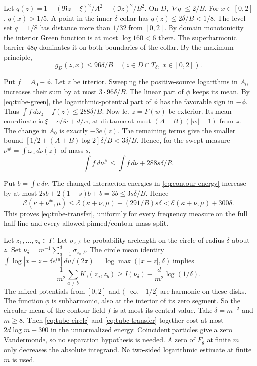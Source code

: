 Let \(q(z)=1-(\Re z-\xi)^2/A^2-(\Im z)^2/B^2\). On \(D\),
\(|\nabla q|\le2/B\). For \(x\in[0,2]\), \(q(x)>1/5\). A point in the inner
\(\delta\)-collar has \(q(z)\le2\delta/B<1/8\). The level set \(q=1/8\) has
distance more than \(1/32\) from \([0,2]\). By domain monotonicity the
interior Green function is at most \(\log160<6\) there. The superharmonic
barrier \(48q\) dominates it on both boundaries of the collar. By the
maximum principle,
\begin{equation}\label{eq:tube-gD}
 g_D(z,x)\le96\delta/B
       \quad(z\in D\cap T_\delta,\ x\in[0,2]).
\end{equation}

Put \(f=A_0-\phi\). Let \(z\) be interior. Sweeping the positive-source
logarithms in \(A_0\) increases their sum by at most \(3\cdot96\delta/B\).
The linear part of \(\phi\) keeps its mean. By \eqref{eq:tube-green}, the
logarithmic-potential part of \(\phi\) has the favorable sign in \(-\phi\).
Thus \(\int f\,d\omega_z-f(z)\le288\delta/B\). Now let \(z=F(w)\) be
exterior. Its mean coordinate is \(\xi+c/\overline w+d/w\), at distance at
most \((A+B)(|w|-1)\) from \(z\). The change in \(A_0\) is exactly
\(-3e(z)\). The remaining terms give the smaller bound
\([1/2+(A+B)\log2]\delta/B<3\delta/B\). Hence, for the swept measure
\(\nu^\#=\int\omega_z\,d\nu(z)\) of mass \(s\),
\[
 \int f\,d\nu^\#\le\int f\,d\nu+288s\delta/B.
\]

Put \(b=\int e\,d\nu\). The changed interaction energies in
\eqref{eq:contour-energy} increase by at most
\(2sb+2(1-s)b+b=3b\le3s\delta/B\). Hence
\[
 \mathcal E(\kappa+\nu^\#,\mu)
  \le\mathcal E(\kappa+\nu,\mu)+(291/B)s\delta
  <\mathcal E(\kappa+\nu,\mu)+300\delta.
\]
This proves \eqref{eq:tube-transfer}, uniformly for every frequency measure
on the full half-line and every allowed pinned/contour mass split.

Let \(z_1,\ldots,z_d\in\Gamma\). Let \(\sigma_{z,\delta}\) be probability
arclength on the circle of radius \(\delta\) about \(z\). Set
\(\nu_\delta=m^{-1}\sum_{a=1}^d\sigma_{z_a,\delta}\). The circle mean
identity \(\int\log|x-z-\delta e^{iu}|\,du/(2\pi)=\log\max(|x-z|,\delta)\)
implies
\begin{equation}\label{eq:tube-circle}
 \frac1{m^2}\sum_{a\ne b}K_0(z_a,z_b)
 \ge I(\nu_\delta)-\frac d{m^2}\log(1/\delta).
\end{equation}
The mixed potentials from \([0,2]\) and \((-\infty,-1/2]\) are harmonic on
these disks. The function \(\phi\) is subharmonic, also at the interior of
its zero segment. So the circular mean of the contour field \(f\) is at
most its central value. Take \(\delta=m^{-2}\) and \(m\ge8\). Then
\eqref{eq:tube-circle} and \eqref{eq:tube-transfer} together cost at most
\(2d\log m+300\) in the unnormalized energy. Coincident particles give a
zero Vandermonde, so no separation hypothesis is needed. A zero of \(F_g\)
at finite \(m\) only decreases the absolute integrand. No two-sided
logarithmic estimate at finite \(m\) is used.
